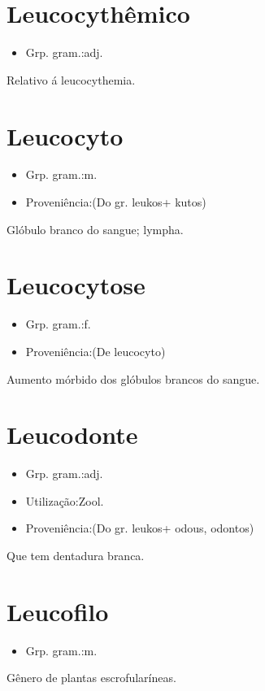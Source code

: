 \section{Leucocythêmico}
\begin{itemize}
\item {Grp. gram.:adj.}
\end{itemize}
Relativo á leucocythemia.
\section{Leucocyto}
\begin{itemize}
\item {Grp. gram.:m.}
\end{itemize}
\begin{itemize}
\item {Proveniência:(Do gr. \textunderscore leukos\textunderscore  + \textunderscore kutos\textunderscore )}
\end{itemize}
Glóbulo branco do sangue; lympha.
\section{Leucocytose}
\begin{itemize}
\item {Grp. gram.:f.}
\end{itemize}
\begin{itemize}
\item {Proveniência:(De \textunderscore leucocyto\textunderscore )}
\end{itemize}
Aumento mórbido dos glóbulos brancos do sangue.
\section{Leucodonte}
\begin{itemize}
\item {Grp. gram.:adj.}
\end{itemize}
\begin{itemize}
\item {Utilização:Zool.}
\end{itemize}
\begin{itemize}
\item {Proveniência:(Do gr. \textunderscore leukos\textunderscore  + \textunderscore odous\textunderscore , \textunderscore odontos\textunderscore )}
\end{itemize}
Que tem dentadura branca.
\section{Leucofilo}
\begin{itemize}
\item {Grp. gram.:m.}
\end{itemize}
Gênero de plantas escrofularíneas.
